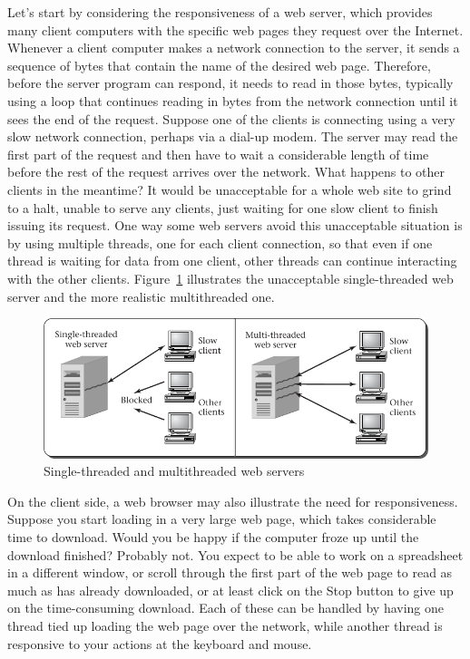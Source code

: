 Let's start by considering the responsiveness of a web server, which provides many client
computers with the specific web pages they request over the Internet.
Whenever a client computer makes a network connection to the server,
it sends a sequence of bytes that contain the name of the desired web
page.  Therefore, before the server program can respond, it needs to
read in those bytes, typically using a loop that continues reading in
bytes from the network connection until it sees the end of the
request.  Suppose one of the clients is connecting using a very slow
network connection, perhaps via a dial-up modem.  The server may read
the first part of the request and then have to wait a considerable
length of time before the rest of the request arrives over the network.  What
happens to other clients in the meantime?  It would be
unacceptable for a whole web site to grind to a halt, unable to serve
any clients, just waiting for one slow client to finish issuing its
request.  One way some web servers avoid this unacceptable situation
is by using multiple threads, one for each client connection, so that
even if one thread is waiting for data from one client, other threads
can continue interacting with the other clients.
Figure~\ref{scan-2-3} illustrates the unacceptable single-threaded web
server and the more realistic multithreaded one.
\begin{figure}
\centerline{\includegraphics{hail_f0205}}
\caption{Single-threaded and multithreaded web servers}
\label{scan-2-3}
\end{figure}

On the client side, a web browser may also illustrate the need for
responsiveness.  Suppose you start loading in a very large web page,
which takes considerable time to download.  Would you be happy
if the computer froze up until the download finished?
Probably not.  You expect to be able to work on a spreadsheet in a
different window, or scroll through the first part of the web page to
read as much as has already downloaded, or at least click on the
Stop button to give up on the time-consuming download.  Each of
these can be handled by having one thread tied up loading the web page
over the network, while another thread is responsive to your actions
at the keyboard and mouse.

